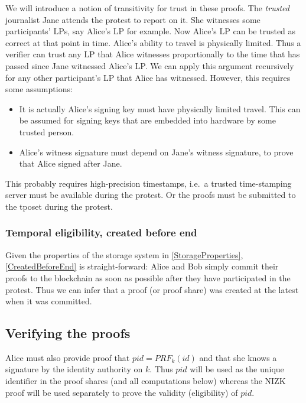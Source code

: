 We will introduce a notion of transitivity for trust in these proofs.
The \emph{trusted} journalist Jane attends the protest to report on it.
She witnesses some participants' \acp{LP}, say Alice's \ac{LP} for example.
Now Alice's \ac{LP} can be trusted as correct at that point in time.
Alice's ability to travel is physically limited.
Thus a verifier can trust any \ac{LP} that Alice witnesses proportionally to 
the time that has passed since Jane witnessed Alice's \ac{LP}.
We can apply this argument recursively for any other participant's \ac{LP} that 
Alice has witnessed.
However, this requires some assumptions:
\begin{itemize}
  \item It is actually Alice's signing key must have physically limited travel.
    This can be assumed for signing keys that are embedded into hardware by 
    some trusted person.
  \item Alice's witness signature must depend on Jane's witness signature, to 
    prove that Alice signed after Jane.
\end{itemize}
\begin{remark}
  This probably requires high-precision timestamps, i.e.\ a trusted 
  time-stamping server must be available during the protest.
  Or the proofs must be submitted to the \ac{tposet} during the protest.
\end{remark}

\subsubsection{Temporal eligibility, created before end}

Given the properties of the storage system in \cref{StorageProperties}, 
\cref{CreatedBeforeEnd} is straight-forward: Alice and Bob simply commit their 
proofs to the blockchain as soon as possible after they have participated in the 
protest.
Thus we can infer that a proof (or proof share) was created at the latest when 
it was committed.

\subsection{Verifying the proofs}

Alice must also provide  proof that \(pid = PRF_k(id)\) and that she 
knows a signature by the identity authority on \(k\).
Thus \(pid\) will be used as the unique identifier in the proof shares (and all 
computations below) whereas the \ac{NIZK} proof will be used separately to prove 
the validity (eligibility) of \(pid\).

